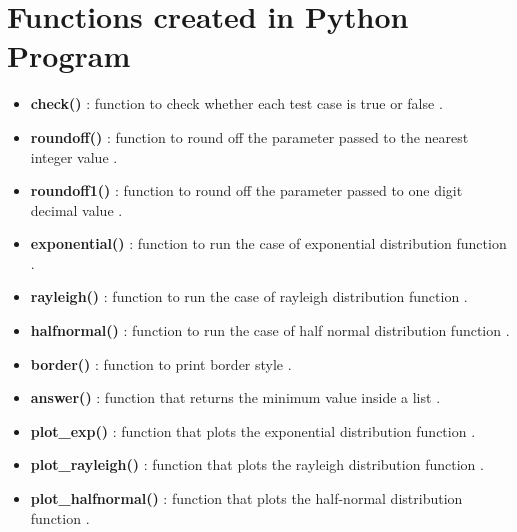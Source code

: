 \documentclass{article}
\begin{document}
\section{Functions created in Python Program}
\vspace{20pt}
\begin{itemize}
    \item \textbf{check()} : function to check whether each test case is true or false .
    \item \textbf{roundoff()} : function to round off the parameter passed to the nearest integer value .
    \item \textbf{roundoff1()} : function to round off the parameter passed to one digit decimal value .
    \item \textbf{exponential()} : function to run the case of exponential distribution function .
    \item \textbf{rayleigh()} : function to run the case of rayleigh distribution function .
    \item \textbf{halfnormal()} : function to run the case of half normal distribution function .
    \item \textbf{border()} :  function to print border style .
    \item \textbf{answer()} : function that returns the minimum value inside a list .
    \item \textbf{plot\_exp()} : function that plots the exponential distribution function .
    \item \textbf{plot\_rayleigh()} : function that plots the rayleigh distribution function .
    \item \textbf{plot\_halfnormal()} : function that plots the half-normal distribution function .
\end{itemize}
\newpage
\end{document}
